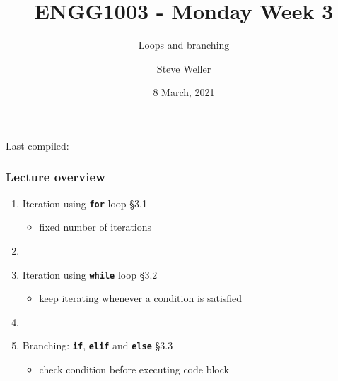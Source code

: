 \documentclass[english,14pt]{beamer}
\title{ENGG1003 - Monday Week 3}
\subtitle{Loops and branching}
\author{Steve Weller}
\institute{University of Newcastle}
\date{8 March, 2021}
\newcommand\red[1]{{\color{red} #1}}
\begin{document}
\begin{flushleft}
{\scriptsize Last compiled:~\DTMnow}
\vspace*{-5mm}
\end{flushleft}
\framebreak


\begin{frame}[fragile]

\frametitle{Lecture overview}
\begin{enumerate}
	\item Iteration using \textbf{\texttt{for}} loop \red{\S3.1}
	\begin{itemize}
		\item fixed number of iterations
	\end{itemize}

	\item[]
	
	\item Iteration using \textbf{\texttt{while}} loop \red{\S3.2}
	\begin{itemize}
		\item keep iterating whenever a condition is satisfied
	\end{itemize}

	\item[]
	
	\item Branching: \textbf{\texttt{if}}, \textbf{\texttt{elif}} and \textbf{\texttt{else}} \red{\S3.3}
	\begin{itemize}
		\item check condition before executing code block
	\end{itemize}
		
\end{enumerate}

\end{frame}

\end{document}
